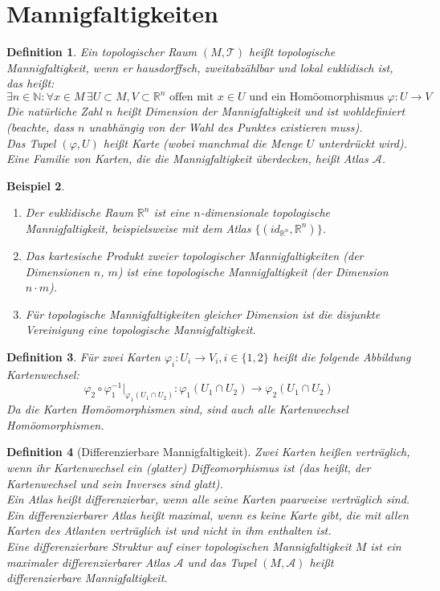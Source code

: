\documentclass[a4paper]{scrreprt}
\numberwithin{equation}{chapter}
\newcommand{\R}{\mathds{R}}
\theoremstyle{plain}
\newtheorem{defn}{Definition}[section]
\newtheorem{bsp}[defn]{Beispiel}
\begin{document}
	\section{Mannigfaltigkeiten}
		\begin{defn}
			Ein topologischer Raum $(M,\mathcal{T})$ heißt topologische Mannigfaltigkeit, wenn er hausdorffsch, zweitabzählbar und lokal euklidisch ist, das heißt:
			\begin{equation*}
				\exists n\in \mathds{N}: \forall x\in M\, \exists U\subset M, V\subset \R^n\text{ offen mit } x\in U \text{ und ein Homöomorphismus } \varphi:U\rightarrow V
			\end{equation*}
			Die natürliche Zahl $n$ heißt Dimension der Mannigfaltigkeit und ist wohldefiniert (beachte, dass $n$ unabhängig von der Wahl des Punktes existieren muss).\\
			Das Tupel $(\varphi,U)$ heißt Karte (wobei manchmal die Menge $U$ unterdrückt wird). Eine Familie von Karten, die die Mannigfaltigkeit überdecken, heißt Atlas $\mathcal{A}$.
		\end{defn}
		\begin{bsp}
			\begin{enumerate}
				\item Der euklidische Raum $\R^n$ ist eine $n$-dimensionale topologische Mannigfaltigkeit, beispielsweise mit dem Atlas $\lbrace (id_{\R^n},\R^n)\rbrace$. 
				\item Das kartesische Produkt zweier topologischer Mannigfaltigkeiten (der Dimensionen $n$, $m$) ist eine topologische Mannigfaltigkeit (der Dimension $n\cdot m$).
				\item Für topologische Mannigfaltigkeiten gleicher Dimension ist die disjunkte Vereinigung eine topologische Mannigfaltigkeit.
			\end{enumerate}
		\end{bsp}
		\begin{defn}
			Für zwei Karten $\varphi_i:U_i\rightarrow V_i, i\in\lbrace 1,2 \rbrace$ heißt die folgende Abbildung Kartenwechsel:
			\begin{equation*}
				\varphi_2\circ\varphi_1^{-1}\vert_{\varphi_1(U_1\cap U_2)}:\varphi_1(U_1\cap U_2)\rightarrow \varphi_2(U_1\cap U_2)
			\end{equation*}
			Da die Karten Homöomorphismen sind, sind auch alle Kartenwechsel Homöomorphismen.
		\end{defn} 
		\begin{defn}[Differenzierbare Mannigfaltigkeit]
			Zwei Karten heißen verträglich, wenn ihr Kartenwechsel ein (glatter) Diffeomorphismus ist (das heißt, der Kartenwechsel und sein Inverses sind glatt).\\
			Ein Atlas heißt differenzierbar, wenn alle seine Karten paarweise verträglich sind.\\
			Ein differenzierbarer Atlas heißt maximal, wenn es keine Karte gibt, die mit allen Karten des Atlanten verträglich ist und nicht in ihm enthalten ist.\\
			Eine differenzierbare Struktur auf einer topologischen Mannigfaltigkeit $M$ ist ein maximaler differenzierbarer Atlas $\mathcal{A}$ und das Tupel $(M,\mathcal{A})$ heißt differenzierbare Mannigfaltigkeit.
		\end{defn}
\end{document}
